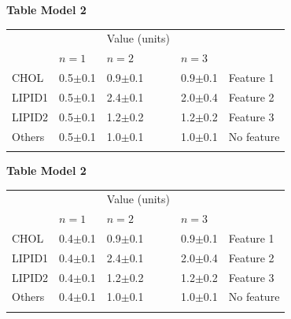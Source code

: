 \documentclass[a0,final,landscape]{a0poster}
\begin{document}
\begin{minipage}[c][-30cm]{0.3\textwidth}
\hspace{-2cm}
\Large\hspace{2cm}\textcolor{vino}{\textbf{Table Model 2}}
\begin{center}
\begin{tabular}{K{5.5cm}K{6cm}K{8cm}K{6cm}K{8cm}}
        &              & Value (units) &              &                           \\ 
        & $n=1$          & $n=2$         & $n=3$          &                           \\ 
CHOL    & 0.5$\pm$0.1  & 0.9$\pm$0.1 & 0.9$\pm$0.1  & \small{Feature 1}       \\
LIPID1      & 0.5$\pm$0.1  & 2.4$\pm$0.1 & 2.0$\pm$0.4  & \small{Feature 2}  \\
LIPID2      & 0.5$\pm$0.1  & 1.2$\pm$0.2 & 1.2$\pm$0.2  & \small{Feature 3}   \\
Others  & 0.5$\pm$0.1  & 1.0$\pm$0.1 & 1.0$\pm$0.1  & \small{No feature} \\  \\
\end{tabular}
\end{center}
\vspace{-1cm}
\Large\textcolor{vino}{\textbf{Table Model 2}}
\vspace{-1cm}
\large
\begin{center}
\begin{tabular}{K{5.5cm}K{6cm}K{8cm}K{6cm}K{8cm}}
        &              & Value (units) &              &                           \\ 
        & $n=1$          & $n=2$         & $n=3$          &                           \\ 
CHOL    & 0.4$\pm$0.1  & 0.9$\pm$0.1 & 0.9$\pm$0.1  & \small{Feature 1}       \\
LIPID1      & 0.4$\pm$0.1  & 2.4$\pm$0.1 & 2.0$\pm$0.4  & \small{Feature 2}  \\
LIPID2      & 0.4$\pm$0.1  & 1.2$\pm$0.2 & 1.2$\pm$0.2  & \small{Feature 3}   \\
Others  & 0.4$\pm$0.1  & 1.0$\pm$0.1 & 1.0$\pm$0.1  & \small{No feature} \\  \\
\end{tabular}
\end{center}
\vspace{-2.5cm}

\end{minipage}
\end{document}
